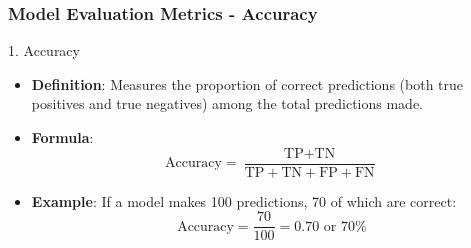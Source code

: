 \documentclass[aspectratio=169]{beamer}
\begin{document}
\begin{frame}[fragile]
    \frametitle{Model Evaluation Metrics - Accuracy}
    \begin{block}{1. Accuracy}
        \begin{itemize}
            \item \textbf{Definition}: Measures the proportion of correct predictions (both true positives and true negatives) among the total predictions made.
            \item \textbf{Formula}:
            \begin{equation}
                \text{Accuracy} = \frac{\text{TP} + \text{TN}}{\text{TP} + \text{TN} + \text{FP} + \text{FN}}
            \end{equation}
            \item \textbf{Example}: If a model makes 100 predictions, 70 of which are correct:
            \begin{equation}
                \text{Accuracy} = \frac{70}{100} = 0.70 \text{ or } 70\%
            \end{equation}
        \end{itemize}
    \end{block}
\end{frame}
\end{document}
